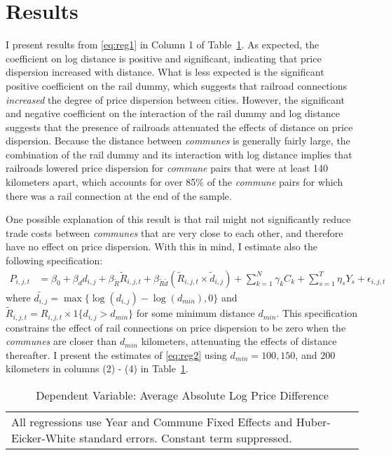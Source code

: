 \documentclass[12pt,twoside]{article}
\begin{document}
\section{Results}

I present results from \eqref{eq:reg1} in Column 1 of Table~\ref{tab:reg1}.
As expected, the coefficient on log distance is positive and significant, indicating that price dispersion increased with distance.
What is less expected is the significant positive coefficient on the rail dummy, which suggests that railroad connections \emph{increased} the degree of price dispersion between cities.
However, the significant and negative coefficient on the interaction of the rail dummy and log distance suggests that the presence of railroads attenuated the effects of distance on price dispersion.
Because the distance between \emph{communes} is generally fairly large, the combination of the rail dummy and its interaction with log distance implies that railroads lowered price dispersion for \emph{commune} pairs that were at least 140 kilometers apart, which accounts for over 85\% of the \emph{commune} pairs for which there was a rail connection at the end of the sample.

One possible explanation of this result is that rail might not significantly reduce trade costs between \emph{communes} that are very close to each other, and therefore have no effect on price dispersion.
With this in mind, I estimate also the following specification:
\begin{align}
	P_{i,j,t} &= \beta_0 + \beta_d d_{i,j} + \beta_{\tilde{R}} \tilde{R}_{i,j,t} + \beta_{\tilde{R}\tilde{d}} (\tilde{R}_{i,j,t} \times \tilde{d}_{i,j}) + \sum_{k=1}^{N} \gamma_k C_k + \sum_{s=1}^{T} \eta_s Y_s + \epsilon_{i,j,t} \label{eq:reg2}
\end{align}
where $\tilde{d_{i,j}} = \max\{ \log( d_{i,j} ) - \log( d_{min} ), 0 \}$ and $\tilde{R}_{i,j,t} = R_{i,j,t} \times 1 \{ d_{i,j} > d_{min} \}$ for some minimum distance $d_{min}$.
This specification constrains the effect of rail connections on price dispersion to be zero when the \emph{communes} are closer than $d_{min}$ kilometers, attenuating the effects of distance thereafter.
I present the estimates of \eqref{eq:reg2} using $d_{min} = 100, 150$, and $200$ kilometers in columns (2) - (4) in Table~\ref{tab:reg1}.

\begin{table}[htbp]\centering
\def\sym#1{\ifmmode^{#1}\else\(^{#1}\)\fi}
\caption{Dependent Variable: Average Absolute Log Price Difference\label{tab:reg1}}
\begin{tabular}{l*{4}{c}}
	\toprule
	
	\bottomrule
	\multicolumn{5}{l}{\footnotesize {\parbox[t]{14cm}{All regressions use Year and Commune Fixed Effects and Huber-Eicker-White standard errors. Constant term suppressed.}}}\\
\end{tabular}
\end{table}
\end{document}
